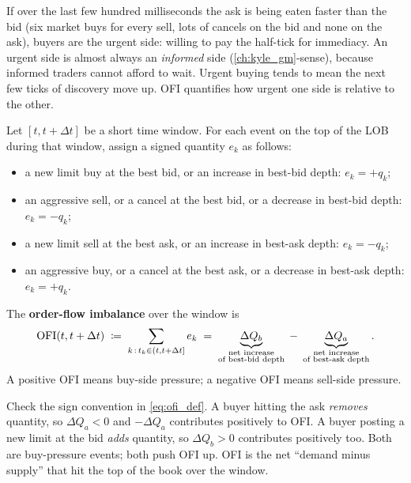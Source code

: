 If over the last few hundred milliseconds the ask is being eaten
faster than the bid (six market buys for every sell, lots of
cancels on the bid and none on the ask), buyers are the urgent
side: willing to pay the half-tick for immediacy. An urgent side
is almost always an \emph{informed} side
(\cref{ch:kyle_gm}-sense), because informed traders cannot
afford to wait. Urgent buying tends to mean the next few ticks
of discovery move up. OFI quantifies how urgent one side is
relative to the other.

\begin{definition}
\label{def:ofi}
Let $[t, t+\Delta t]$ be a short time window. For each event on
the top of the LOB during that window, assign a signed quantity
$e_k$ as follows:
\begin{itemize}
  \item a new limit buy at the best bid, or an increase in
  best-bid depth: $e_k = +q_k$;
  \item an aggressive sell, or a cancel at the best bid, or a
  decrease in best-bid depth: $e_k = -q_k$;
  \item a new limit sell at the best ask, or an increase in
  best-ask depth: $e_k = -q_k$;
  \item an aggressive buy, or a cancel at the best ask, or a
  decrease in best-ask depth: $e_k = +q_k$.
\end{itemize}
The \textbf{order-flow imbalance} over the window is
\begin{equation}
  \label{eq:ofi_def}
  \mathrm{OFI}(t, t+\Delta t) \;\coloneqq\;
  \sum_{k \,:\, t_k \in (t, t+\Delta t]} e_k
  \;=\;
  \underbrace{\Delta Q_b}_{\substack{\text{net increase}\\\text{of best-bid depth}}}
  \;-\;
  \underbrace{\Delta Q_a}_{\substack{\text{net increase}\\\text{of best-ask depth}}}.
\end{equation}
A positive OFI means buy-side pressure; a negative OFI means
sell-side pressure.
\end{definition}

Check the sign convention in \cref{eq:ofi_def}. A buyer hitting
the ask \emph{removes} quantity, so $\Delta Q_a < 0$ and
$-\Delta Q_a$ contributes positively to OFI. A buyer posting a
new limit at the bid \emph{adds} quantity, so $\Delta Q_b > 0$
contributes positively too. Both are buy-pressure events; both
push OFI up. OFI is the net ``demand minus supply'' that hit the
top of the book over the window.

